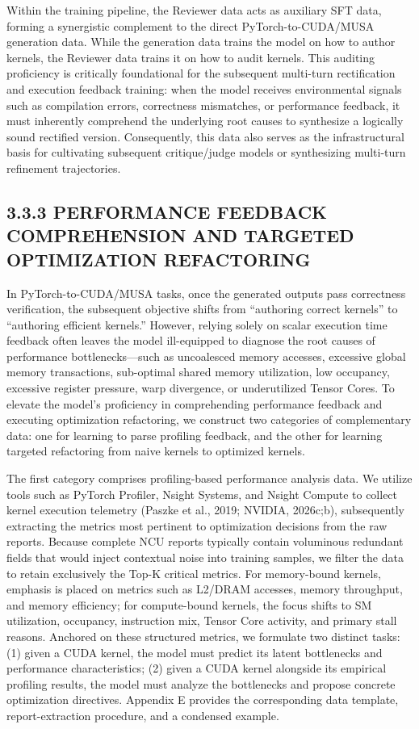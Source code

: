 \documentclass[
  10
]{article}
\begin{document}
Within the training pipeline, the Reviewer data acts as auxiliary SFT
data, forming a synergistic complement to the direct
PyTorch-to-CUDA/MUSA generation data. While the generation data trains
the model on how to author kernels, the Reviewer data trains it on how
to audit kernels. This auditing proficiency is critically foundational
for the subsequent multi-turn rectification and execution feedback
training: when the model receives environmental signals such as
compilation errors, correctness mismatches, or performance feedback, it
must inherently comprehend the underlying root causes to synthesize a
logically sound rectified version. Consequently, this data also serves
as the infrastructural basis for cultivating subsequent critique/judge
models or synthesizing multi-turn refinement trajectories.

\subsection{3.3.3 PERFORMANCE FEEDBACK COMPREHENSION AND TARGETED
OPTIMIZATION
REFACTORING}\label{performance-feedback-comprehension-and-targeted-optimization-refactoring}

In PyTorch-to-CUDA/MUSA tasks, once the generated outputs pass
correctness verification, the subsequent objective shifts from
``authoring correct kernels'' to ``authoring efficient kernels.''
However, relying solely on scalar execution time feedback often leaves
the model ill-equipped to diagnose the root causes of performance
bottlenecks---such as uncoalesced memory accesses, excessive global
memory transactions, sub-optimal shared memory utilization, low
occupancy, excessive register pressure, warp divergence, or
underutilized Tensor Cores. To elevate the model's proficiency in
comprehending performance feedback and executing optimization
refactoring, we construct two categories of complementary data: one for
learning to parse profiling feedback, and the other for learning
targeted refactoring from naive kernels to optimized kernels.

The first category comprises profiling-based performance analysis data.
We utilize tools such as PyTorch Profiler, Nsight Systems, and Nsight
Compute to collect kernel execution telemetry (Paszke et al., 2019;
NVIDIA, 2026c;b), subsequently extracting the metrics most pertinent to
optimization decisions from the raw reports. Because complete NCU
reports typically contain voluminous redundant fields that would inject
contextual noise into training samples, we filter the data to retain
exclusively the Top-K critical metrics. For memory-bound kernels,
emphasis is placed on metrics such as L2/DRAM accesses, memory
throughput, and memory efficiency; for compute-bound kernels, the focus
shifts to SM utilization, occupancy, instruction mix, Tensor Core
activity, and primary stall reasons. Anchored on these structured
metrics, we formulate two distinct tasks: (1) given a CUDA kernel, the
model must predict its latent bottlenecks and performance
characteristics; (2) given a CUDA kernel alongside its empirical
profiling results, the model must analyze the bottlenecks and propose
concrete optimization directives. Appendix E provides the corresponding
data template, report-extraction procedure, and a condensed example.
\end{document}
